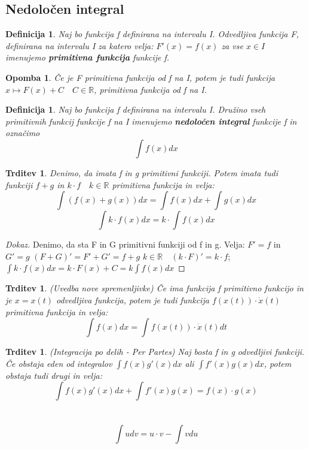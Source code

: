 \documentclass[11pt]{article}
\newtheorem{Trditev}[Izrek]{{\sc Trditev}}
\newtheorem{Definicija}[Izrek]{{\sc Definicija}}
\newtheorem{Opomba}[Izrek]{{\sc Opomba}}
\newenvironment{dokaz}[1][{\sc Dokaz}]{\begin{proof}[#1]\renewcommand*{\qedsymbol}{\(\blacksquare\)}}{\end{proof}}
\begin{document}
\subsection{Nedoločen integral}
\begin{Definicija}
	Naj bo funkcija f definirana na intervalu I. Odvedljiva funkcija F, definirana na intervalu I za katero velja: $F'(x) =f(x)$ za vse $x \in I$ imenujemo \textbf{primitivna funkcija} funkcije f.
\end{Definicija}
\begin{Opomba}
	Če je F primitivna funkcija od f na I, potem je tudi funkcija \newline
	$x \mapsto F(x) + C \quad C\in \mathbb{R}$, primitivna funkcija od f na I.
\end{Opomba}
\begin{Definicija}
	Naj bo funkcija f definirana na intervalu I. Družino vseh primitivnih funkcij funkcije f na I imenujemo \textbf{nedoločen integral} funkcije f in označimo
	$$\int{f(x)} dx$$
\end{Definicija}
\begin{Trditev}
	Denimo, da imata f in g primitivni funkciji. Potem imata tudi funkciji $f+g$ in $k\cdot f \quad k\in \mathbb{R}$ primitivna funkcija in velja:
	$$\int{(f(x) + g(x))}dx = \int{f(x) dx} + \int{g(x) dx}$$
	$$\int{k \cdot f(x) dx} = k \cdot \int{f(x) dx}$$
\end{Trditev}
\begin{dokaz}
	Denimo, da sta F in G primitivni funkciji od f in g.
	\newline
	Velja: $F' = f$ in $G' = g$
	\newline
	$(F+G)' = F' + G' = f + g$
	\newline
	\newline
	$k\in \mathbb{R} \quad (k\cdot F)' = k \cdot f$;
	\newline
	$\int{k \cdot f(x)}dx = k \cdot F(x) + C = k \int{f(x) dx}$
\end{dokaz}
\begin{Trditev}
	(Uvedba nove spremenljivke)
	Če ima funkcija f primitivno funkcijo in je $x = x(t)$ odvedljiva funkcija, potem je tudi funkcija $f(x(t)) \cdot \dot{x}(t)$ primitivna funkcija in velja:
	$$\int{f(x) dx} = \int{ f(x(t)) \cdot \dot{x}(t)}dt$$
\end{Trditev}
\begin{Trditev}
	(Integracija po delih - Per Partes) Naj bosta f in g odvedljivi funkciji. Če obstaja eden od integralov $\int{f(x) g'(x)}dx$ ali $\int{f'(x) g(x)}dx$, potem obstaja tudi drugi in velja:
	$$\int{f(x) g'(x)}dx + \int{f'(x) g(x)} =f(x) \cdot g(x)$$
	\\
	\\
	$$\int{u dv} = u \cdot v - \int{v du}$$
\end{Trditev}
\end{document}
